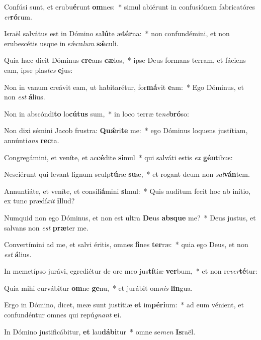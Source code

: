 \item Confúsi sunt, et erubu\textbf{é}runt \textbf{om}nes:~* simul abiérunt in confusiónem fabricatóres \textit{er}\textbf{ró}rum.
\item Israël salvátus est in Dómino sa\textbf{lú}te æ\textbf{tér}na:~* non confundémini, et non erubescétis usque in sǽcu\textit{lum} \textbf{sǽ}culi.
\item Quia hæc dicit Dóminus \textbf{cre}ans \textbf{cæ}los,~* ipse Deus formans terram, et fáciens eam, ipse plas\textit{tes} \textbf{e}jus:
\item Non in vanum creávit eam, ut habitarétur, for\textbf{má}vit \textbf{e}am:~* Ego Dóminus, et non \textit{est} \textbf{á}lius.
\item Non in abscóndi\textbf{to} lo\textbf{cú}\textbf{tus} sum,~* in loco terræ te\textit{ne}\textbf{bró}so:
\item Non dixi sémini Jacob frustra: \textbf{Quǽ}ri\textbf{te} me:~* ego Dóminus loquens justítiam, annúnti\textit{ans} \textbf{rec}ta.
\item Congregámini, et veníte, et ac\textbf{cé}dite \textbf{si}mul~* qui salváti estis \textit{ex} \textbf{gén}tibus:
\item Nesciérunt qui levant lignum sculp\textbf{tú}ræ \textbf{su}æ,~* et rogant deum non \textit{sal}\textbf{ván}tem.
\item Annuntiáte, et veníte, et consili\textbf{á}mini \textbf{si}mul:~* Quis audítum fecit hoc ab inítio, ex tunc prædí\textit{xit} \textbf{il}lud?
\item Numquid non ego Dóminus, et non est ultra \textbf{De}us \textbf{abs}\textbf{que} me?~* Deus justus, et salvans non \textit{est} \textbf{præ}ter me.
\item Convertímini ad me, et salvi éritis, omnes \textbf{fi}nes \textbf{ter}ræ:~* quia ego Deus, et non \textit{est} \textbf{á}lius.
\item In memetípso jurávi, egrediétur de ore meo jus\textbf{tí}tiæ \textbf{ver}bum,~* et non re\textit{ver}\textbf{té}tur:
\item Quia mihi curvábitur \textbf{om}ne \textbf{ge}nu,~* et jurábit om\textit{nis} \textbf{lin}gua.
\item Ergo in Dómino, dicet, meæ sunt justítiæ \textbf{et} im\textbf{pé}\textbf{ri}um:~* ad eum vénient, et confundéntur omnes qui repú\textit{gnant} \textbf{e}i.
\item In Dómino justificábitur, \textbf{et} lau\textbf{dá}\textbf{bi}tur~* omne se\textit{men} \textbf{Is}raël.
